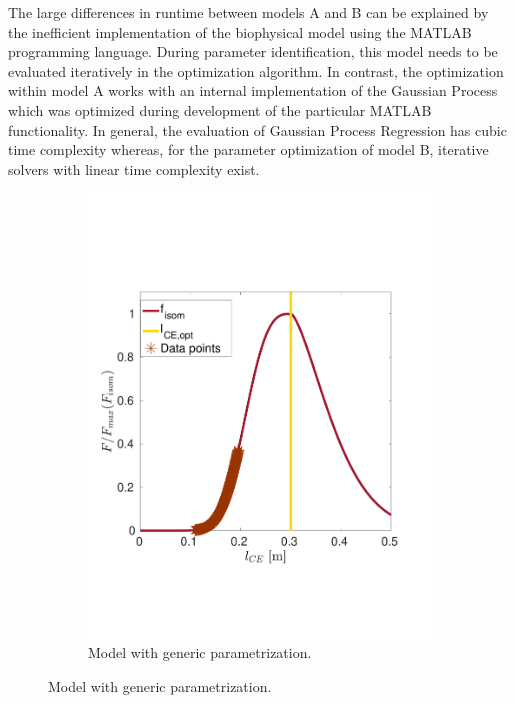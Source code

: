 The large differences in runtime between models A and B can be explained by the inefficient implementation of the biophysical model using the MATLAB programming language. During parameter identification, this model needs to be evaluated iteratively in the optimization algorithm. In contrast, the optimization within model A works with an internal implementation of the Gaussian Process which was optimized during development of the particular MATLAB functionality.
In general, the evaluation of Gaussian Process Regression has cubic time complexity whereas, for the parameter optimization of model B, iterative solvers with linear time complexity exist.

\begin{figure}%
  \centering%
  \begin{subfigure}[t]{0.47\textwidth}%
    \centering%
    \includegraphics[width=\textwidth]{images/summer_school_study/biceps_initial.pdf}%
    \caption{Model with generic parametrization.}%
    \label{fig:biceps_a}%
  \end{subfigure}%

\end{figure}
